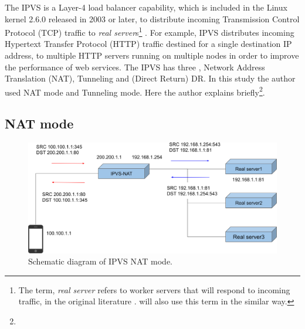 The IPVS is a Layer-4 load balancer capability, which is included in the Linux kernel 2.6.0 released in 2003 or later, 
to distribute incoming Transmission Control Protocol (TCP) traffic  to 
{\em real server}s\footnote{The term, {\em real server} refers to worker servers that will respond to incoming traffic, 
in the original literature \cite{Zhang2000}.  will also use this term in the similar way.} \cite{Zhang2000}. 
For example, IPVS distributes incoming Hypertext Transfer Protocol (HTTP) traffic destined for a single destination IP address, to multiple HTTP servers running on multiple nodes in order to improve the performance of web services.
The IPVS has three , Network Address Translation (NAT), Tunneling and (Direct Return) DR.
In this study the author used NAT mode and Tunneling mode.
Here the author explains  briefly\footnote{}.

\subsection{NAT mode}

\begin{figure}[h]
  \centering
  \includegraphics[width=0.95\columnwidth]{Figs/ipvs-nat-schem}

  \par\bigskip
  \centering
  \begin{minipage}{0.9\columnwidth}
    \caption[IPVS NAT mode]{
    Schematic diagram of IPVS NAT mode.
    }
    \label{fig:ipvs-nat-schem}
  \end{minipage}
\end{figure}

